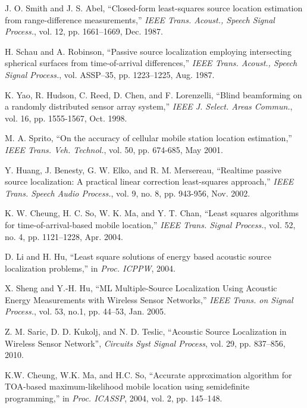 \begin{thebibliography}{99}


J. O. Smith and J. S. Abel, ``Closed-form least-squares source location
estimation from range-difference measurements,'' {\em IEEE Trans. Acoust.,
Speech Signal Process.}, vol. 12, pp. 1661--1669, Dec. 1987.

H. Schau and A. Robinson, ``Passive source localization employing intersecting spherical surfaces from time-of-arrival differences,'' {\em IEEE Trans. Acoust., Speech Signal Process.}, vol. ASSP--35, pp. 1223--1225, Aug. 1987.

K. Yao, R. Hudson, C. Reed, D. Chen, and F. Lorenzelli, ``Blind beamforming on a randomly
distributed sensor array system,'' {\em IEEE J. Select. Areas Commun.}, vol. 16, pp. 1555-1567, Oct. 1998.

 M. A. Sprito, ``On the accuracy of cellular mobile station location estimation,'' {\em IEEE Trans. Veh. Technol.}, vol. 50, pp. 674-685, May 2001.

 Y. Huang, J. Benesty, G. W. Elko, and R. M. Mersereau, ``Realtime passive source localization: A practical linear correction least-squares approach,'' {\em IEEE Trans. Speech Audio Process.}, vol. 9, no. 8, pp. 943-956, Nov. 2002.

 K. W. Cheung, H. C. So, W. K. Ma, and Y. T. Chan, ``Least squares algorithms for time-of-arrival-based mobile location,'' {\em IEEE Trans. Signal Process.}, vol. 52, no. 4, pp. 1121--1228, Apr. 2004.

D. Li and H. Hu, ``Least square solutions of energy based acoustic source localization problems,'' in {\em Proc. ICPPW}, 2004.

X. Sheng and Y.-H. Hu, ``ML Multiple-Source Localization Using Acoustic Energy Measurements with Wireless Sensor Networks,'' {\em IEEE Trans. on Signal Process.}, vol. 53, no.1, pp. 44--53, Jan. 2005.

Z. M. Saric, D. D. Kukolj, and N. D. Teslic, ``Acoustic Source Localization in Wireless Sensor Network'', {\em Circuits Syst Signal Process}, vol. 29, pp. 837--856, 2010.

K.W. Cheung, W.K. Ma, and H.C. So, ``Accurate approximation algorithm for TOA-based maximum-likelihood mobile location using semidefinite programming,'' in {\em Proc. ICASSP}, 2004, vol. 2, pp. 145--148.


\end{thebibliography}
